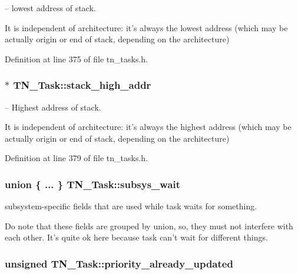 -- lowest address of stack. 

It is independent of architecture\+: it's always the lowest address (which may be actually origin or end of stack, depending on the architecture) 

Definition at line 375 of file tn\+\_\+tasks.\+h.

\hypertarget{structTN__Task_a4497d6972b9a7706608708847d29aa46}{
\subsubsection[{stack\+\_\+high\+\_\+addr}]{$\ast$ T\+N\+\_\+\+Task\+::stack\+\_\+high\+\_\+addr}}\label{structTN__Task_a4497d6972b9a7706608708847d29aa46}


-- Highest address of stack. 

It is independent of architecture\+: it's always the highest address (which may be actually origin or end of stack, depending on the architecture) 

Definition at line 379 of file tn\+\_\+tasks.\+h.

\hypertarget{structTN__Task_ae6f4bd3d67e5499ef2c5fb7c72ec6276}{
\subsubsection[{subsys\+\_\+wait}]{\setlength{\rightskip}{0pt plus 5cm}union \{ ... \}   T\+N\+\_\+\+Task\+::subsys\+\_\+wait}}\label{structTN__Task_ae6f4bd3d67e5499ef2c5fb7c72ec6276}


subsystem-\/specific fields that are used while task waits for something. 

Do note that these fields are grouped by union, so, they must not interfere with each other. It's quite ok here because task can't wait for different things. \hypertarget{structTN__Task_abb4d22974c7317dd610f646b9048656d}{
\subsubsection[{priority\+\_\+already\+\_\+updated}]{\setlength{\rightskip}{0pt plus 5cm}unsigned T\+N\+\_\+\+Task\+::priority\+\_\+already\+\_\+updated}}\label{structTN__Task_abb4d22974c7317dd610f646b9048656d}


